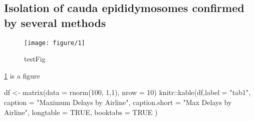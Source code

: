 \documentclass[12pt,twoside]{reedthesis}
\newenvironment{Shaded}{\begin{snugshade}}{\end{snugshade}}
\newcommand{\AttributeTok}[1]{\textcolor[rgb]{0.77,0.63,0.00}{#1}}
\newcommand{\ConstantTok}[1]{\textcolor[rgb]{0.00,0.00,0.00}{#1}}
\newcommand{\DecValTok}[1]{\textcolor[rgb]{0.00,0.00,0.81}{#1}}
\newcommand{\FunctionTok}[1]{\textcolor[rgb]{0.00,0.00,0.00}{#1}}
\newcommand{\NormalTok}[1]{#1}
\newcommand{\OtherTok}[1]{\textcolor[rgb]{0.56,0.35,0.01}{#1}}
\newcommand{\SpecialCharTok}[1]{\textcolor[rgb]{0.00,0.00,0.00}{#1}}
\newcommand{\StringTok}[1]{\textcolor[rgb]{0.31,0.60,0.02}{#1}}
\begin{document}
\hypertarget{isolation-of-cauda-epididymosomes-confirmed-by-several-methods}{%
\subsection{Isolation of cauda epididymosomes confirmed by several methods}\label{isolation-of-cauda-epididymosomes-confirmed-by-several-methods}}
\begin{figure}

{\centering \texttt{[image: figure/1]} 

}

\caption{testFig}\label{fig:fig1}
\end{figure}
\ref{fig:fig1} is a figure
\begin{Shaded}
\begin{Highlighting}[]
\NormalTok{df }\OtherTok{\textless{}{-}} \FunctionTok{matrix}\NormalTok{(}\AttributeTok{data =} \FunctionTok{rnorm}\NormalTok{(}\DecValTok{100}\NormalTok{, }\DecValTok{1}\NormalTok{,}\DecValTok{1}\NormalTok{), }\AttributeTok{nrow =} \DecValTok{10}\NormalTok{)}
\NormalTok{knitr}\SpecialCharTok{::}\FunctionTok{kable}\NormalTok{(df,}\AttributeTok{label =} \StringTok{"tab1"}\NormalTok{,}
  \AttributeTok{caption =} \StringTok{"Maximum Delays by Airline"}\NormalTok{,}
  \AttributeTok{caption.short =} \StringTok{"Max Delays by Airline"}\NormalTok{,}
  \AttributeTok{longtable =} \ConstantTok{TRUE}\NormalTok{,}
  \AttributeTok{booktabs =} \ConstantTok{TRUE}
\NormalTok{)}
\end{Highlighting}
\end{Shaded}
\end{document}
